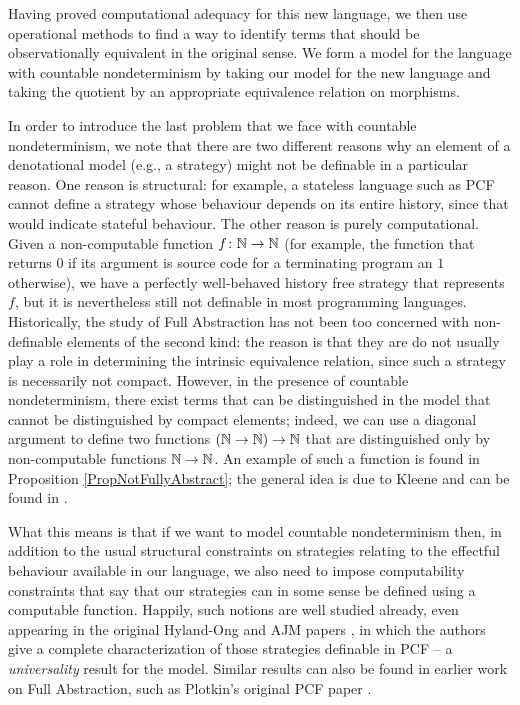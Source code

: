 Having proved computational adequacy for this new language, we then use operational methods to find a way to identify terms that should be observationally equivalent in the original sense.  
We form a model for the language with countable nondeterminism by taking our model for the new language and taking the quotient by an appropriate equivalence relation on morphisms.

In order to introduce the last problem that we face with countable nondeterminism, we note that there are two different reasons why an element of a denotational model (e.g., a strategy) might not be definable in a particular reason.  
One reason is structural: for example, a stateless language such as PCF cannot define a strategy whose behaviour depends on its entire history, since that would indicate stateful behaviour.  
The other reason is purely computational.  
Given a non-computable function $f\colon \mathbb{N} \to \mathbb{N}$ (for example, the function that returns $0$ if its argument is source code for a terminating program an $1$ otherwise), we have a perfectly well-behaved history free strategy that represents $f$, but it is nevertheless still not definable in most programming languages.  
Historically, the study of Full Abstraction has not been too concerned with non-definable elements of the second kind: the reason is that they are do not usually play a role in determining the intrinsic equivalence relation, since such a strategy is necessarily not compact.  
However, in the presence of countable nondeterminism, there exist terms that can be distinguished in the model that cannot be distinguished by compact elements; indeed, we can use a diagonal argument to define two functions $(\mathbb{N} \to \mathbb{N}) \to \mathbb{N}$ that are distinguished only by non-computable functions $\mathbb{N} \to \mathbb{N}$.  
An example of such a function is found in Proposition \ref{PropNotFullyAbstract}; the general idea is due to Kleene and can be found in \cite{KleeneTree}.

What this means is that if we want to model countable nondeterminism then, in addition to the usual structural constraints on strategies relating to the effectful behaviour available in our language, we also need to impose computability constraints that say that our strategies can in some sense be defined using a computable function.  
Happily, such notions are well studied already, even appearing in the original Hyland-Ong and AJM papers \cite{hoPcf,ajmPcf}, in which the authors give a complete characterization of those strategies definable in PCF -- a \emph{universality} result for the model.
Similar results can also be found in earlier work on Full Abstraction, such as Plotkin's original PCF paper \cite{PlotkinPcf}.

